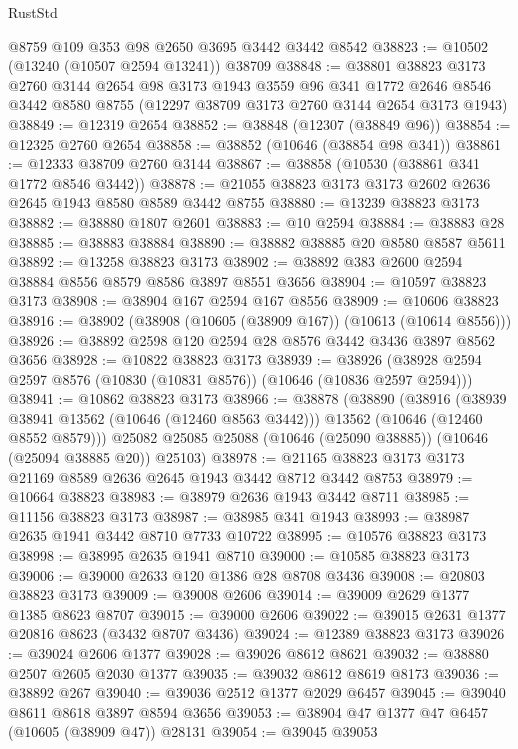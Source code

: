 \begin{lexlean}{RustStd}
\begin{coremodule}
    @8759
    @109
    @353
    @98
    @2650
    @3695
    @3442
    @3442
    @8542
@38823 := @10502 (@13240 (@10507 @2594 @13241)) @38709
@38848 := @38801
    @38823
    @3173
    @2760
    @3144
    @2654
    @98
    @3173
    @1943
    @3559
    @96
    @341
    @1772
    @2646
    @8546
    @3442
    @8580
    @8755
    (@12297 @38709 @3173 @2760 @3144 @2654 @3173 @1943)
@38849 := @12319 @2654
@38852 := @38848 (@12307 (@38849 @96))
@38854 := @12325 @2760 @2654
@38858 := @38852 (@10646 (@38854 @98 @341))
@38861 := @12333 @38709 @2760 @3144
@38867 := @38858 (@10530 (@38861 @341 @1772 @8546 @3442))
@38878 := @21055 @38823 @3173 @3173 @2602 @2636 @2645 @1943 @8580 @8589 @3442 @8755
@38880 := @13239 @38823 @3173
@38882 := @38880 @1807 @2601
@38883 := @10 @2594
@38884 := @38883 @28
@38885 := @38883 @38884
@38890 := @38882 @38885 @20 @8580 @8587 @5611
@38892 := @13258 @38823 @3173
@38902 := @38892 @383 @2600 @2594 @38884 @8556 @8579 @8586 @3897 @8551 @3656
@38904 := @10597 @38823 @3173
@38908 := @38904 @167 @2594 @167 @8556
@38909 := @10606 @38823
@38916 := @38902 (@38908 (@10605 (@38909 @167)) (@10613 (@10614 @8556)))
@38926 := @38892 @2598 @120 @2594 @28 @8576 @3442 @3436 @3897 @8562 @3656
@38928 := @10822 @38823 @3173
@38939 := @38926 (@38928 @2594 @2597 @8576 (@10830 (@10831 @8576)) (@10646 (@10836 @2597 @2594)))
@38941 := @10862 @38823 @3173
@38966 := @38878
    (@38890
      (@38916
        (@38939 @38941 @13562 (@10646 (@12460 @8563 @3442)))
        @13562
        (@10646 (@12460 @8552 @8579)))
      @25082
      @25085
      @25088
      (@10646 (@25090 @38885))
      (@10646 (@25094 @38885 @20))
      @25103)
@38978 := @21165 @38823 @3173 @3173 @21169 @8589 @2636 @2645 @1943 @3442 @8712 @3442 @8753
@38979 := @10664 @38823
@38983 := @38979 @2636 @1943 @3442 @8711
@38985 := @11156 @38823 @3173
@38987 := @38985 @341 @1943
@38993 := @38987 @2635 @1941 @3442 @8710 @7733 @10722
@38995 := @10576 @38823 @3173
@38998 := @38995 @2635 @1941 @8710
@39000 := @10585 @38823 @3173
@39006 := @39000 @2633 @120 @1386 @28 @8708 @3436
@39008 := @20803 @38823 @3173
@39009 := @39008 @2606
@39014 := @39009 @2629 @1377 @1385 @8623 @8707
@39015 := @39000 @2606
@39022 := @39015 @2631 @1377 @20816 @8623 (@3432 @8707 @3436)
@39024 := @12389 @38823 @3173
@39026 := @39024 @2606 @1377
@39028 := @39026 @8612 @8621
@39032 := @38880 @2507 @2605 @2030 @1377
@39035 := @39032 @8612 @8619 @8173
@39036 := @38892 @267
@39040 := @39036 @2512 @1377 @2029 @6457
@39045 := @39040 @8611 @8618 @3897 @8594 @3656
@39053 := @38904 @47 @1377 @47 @6457 (@10605 (@38909 @47)) @28131
@39054 := @39045 @39053

\end{coremodule}
\end{lexlean}
